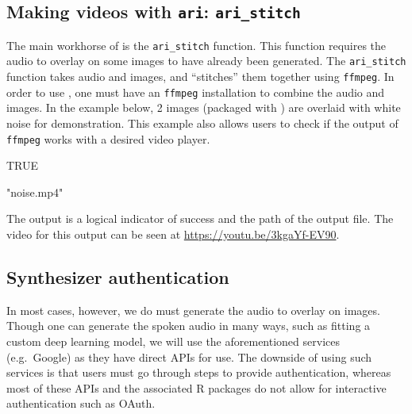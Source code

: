 \hypertarget{making-videos-with-ari-ari_stitch}{%
\subsection{\texorpdfstring{Making videos with \texttt{ari}:
\texttt{ari\_stitch}}{Making videos with ari: ari\_stitch}}\label{making-videos-with-ari-ari_stitch}}

The main workhorse of  is the \texttt{ari\_stitch} function.
This function requires the audio to overlay on some images to have
already been generated. The \texttt{ari\_stitch} function takes audio
and images, and ``stitches'' them together using \texttt{ffmpeg}. In
order to use , one must have an \texttt{ffmpeg} installation to
combine the audio and images. In the example below, 2 images (packaged
with ) are overlaid with white noise for demonstration. This
example also allows users to check if the output of \texttt{ffmpeg}
works with a desired video player.

\begin{Schunk}
\end{Schunk}

\begin{Schunk}
\begin{Soutput}
[1] TRUE
\end{Soutput}
\begin{Soutput}
[1] "noise.mp4"
\end{Soutput}
\end{Schunk}

The output is a logical indicator of success and the path of the output
file. The video for this output can be seen at
\url{https://youtu.be/3kgaYf-EV90}.

\hypertarget{synthesizer-authentication}{%
\subsection{Synthesizer
authentication}\label{synthesizer-authentication}}

In most cases, however, we do must generate the audio to overlay on
images. Though one can generate the spoken audio in many ways, such as
fitting a custom deep learning model, we will use the aforementioned
services (e.g.~Google) as they have direct APIs for use. The downside of
using such services is that users must go through steps to provide
authentication, whereas most of these APIs and the associated R packages
do not allow for interactive authentication such as OAuth.

